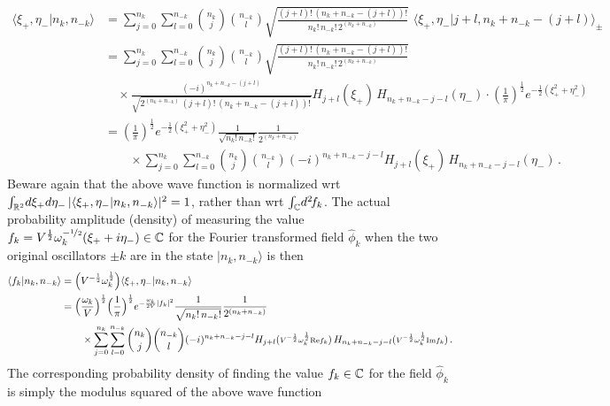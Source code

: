 \documentclass[../QFT_main.tex]{subfiles}
\begin{document}
\begin{mytheorem}
{\begin{align}
    \langle \xi_+,\eta_- | n_k, n_{-k} \rangle 
    &= \sum_{j=0}^{n_k} \sum_{l=0}^{n_{-k}} \binom{n_k}{j} \binom{n_{-k}}{l}\sqrt{\frac{(j+l)!\, (n_k + n_{-k} - (j+l))!}{n_k!\, n_{-k}!\, 2^{(n_k+n_{-k})}}}\,\,\langle \xi_+,\eta_- | j+l, n_k + n_{-k} - (j+l)\rangle_{\pm}
    \\
    &= \sum_{j=0}^{n_k} \sum_{l=0}^{n_{-k}} \binom{n_k}{j} \binom{n_{-k}}{l}\sqrt{\frac{(j+l)!\, (n_k + n_{-k} - (j+l))!}{n_k!\, n_{-k}!\, 2^{(n_k+n_{-k})}}}
    \\
    &\quad \times \frac{(-i)^{n_k + n_{-k} - (j+l)}}{\sqrt{2^{(n_k + n_{-k})} \,(j+l)!\, (n_k + n_{-k} - (j+l))!}} H_{j+l}(\xi_+)\, H_{n_k + n_{-k} - j-l}(\eta_-) \cdot \left( \tfrac{1}{\pi} \right)^{\frac{1}{2}} e^{-\frac{1}{2}(\xi_{+}^2 + \eta_{-}^2)}
    \\
    &= \left( \tfrac{1}{\pi} \right)^{\frac{1}{2}} e^{-\frac{1}{2}(\xi_{+}^2 + \eta_{-}^2)} \frac{1}{\sqrt{n_k!\, n_{-k}!}} \frac{1}{2^{(n_k + n_{-k})}} 
    \\
    &\qquad\times \sum_{j=0}^{n_k} \sum_{l=0}^{n_{-k}} \binom{n_k}{j} \binom{n_{-k}}{l} (-i)^{n_k + n_{-k} - j-l} H_{j+l}(\xi_+)\, H_{n_k + n_{-k} - j-l}(\eta_-)\,.
\end{align}
}
%
Beware again that the above wave function is normalized wrt $\int_{\mathbb{R}^2} \!d\xi_+ d\eta_-\, |\langle \xi_+, \eta_- | n_k, n_{-k} \rangle|^2 = 1$, rather than wrt $\int_{\mathbb{C}} \!d^2\!f_k$.
%
The actual probability amplitude (density) of measuring the value $f_k=V^{\frac{1}{2}}\omega_k^{-\nicefrac{1}{2}}(\xi_+ + i \eta_-)\in\mathbb{C}$ for the Fourier transformed field $\hat{\phi}_k$ when the two original oscillators $\pm k$ are in the state $|n_k, n_{-k}\rangle$ is then
{\small
\begin{align}
    \langle f_k | n_k, n_{-k} \rangle &= \Big(V^{-\frac{1}{2}}\omega_k^{\frac{1}{2}}\Big) \langle \xi_+, \eta_- | n_k, n_{-k} \rangle
    \\
    &= \Big(\frac{\omega_k}{V}\Big)^{\frac{1}{2}} \Big( \frac{1}{\pi} \Big)^{\frac{1}{2}} 
    e^{-\frac{\omega_k}{2V}|f_k|^2} \frac{1}{\sqrt{n_k!\, n_{-k}!}} \frac{1}{2^{(n_k + n_{-k})}}
    \\
    &\qquad\times \sum_{j=0}^{n_k} \sum_{l=0}^{n_{-k}} \binom{n_k}{j} \binom{n_{-k}}{l} (-i)^{n_k + n_{-k} - j-l} H_{j+l}(\text{\scriptsize $V^{-\frac{1}{2}}\omega_k^{\frac{1}{2}}\text{Re}f_k$})\, H_{n_k + n_{-k} - j-l}(\text{\scriptsize $V^{-\frac{1}{2}}\omega_k^{\frac{1}{2}}\text{Im}f_k$})\,.
\end{align}
}
%
The corresponding probability density of finding the value $f_k\in\mathbb{C}$ for the field $\hat{\phi}_k$ is simply the modulus squared of the above wave function

\end{mytheorem}
\end{document}
